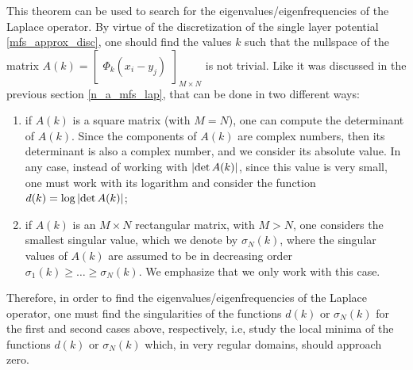 This theorem can be used to search for the eigenvalues/eigenfrequencies of the Laplace operator. By virtue of the discretization of the single layer potential \eqref{mfs_approx_disc}, one should find the values \(k\) such that the nullspace of the matrix \(A(k) = \begin{bmatrix}
    \Phi_k(x_i - y_j)
\end{bmatrix}_{M \times N}\) is not trivial. Like it was discussed in the previous section \ref{n_a_mfs_lap}, that can be done in two different ways:
\begin{enumerate}
    \item if \(A(k)\) is a square matrix (with \(M=N\)), one can compute the determinant of \(A(k)\). Since the components of \(A(k)\) are complex numbers, then its determinant is also a complex number, and we consider its absolute value. In any case, instead of working with \(\abs{\determinant A(k)}\), since this value is very small, one must work with its logarithm and consider the function \(d(k) = \log \abs{\determinant A(k)}\);
    \item if \(A(k)\) is an \(M\times N\) rectangular matrix, with \(M > N\), one considers the smallest singular value, which we denote by \(\sigma_N(k)\), where the singular values of \(A(k)\) are assumed to be in decreasing order \(\sigma_1(k) \geq \dots \geq \sigma_N(k)\). We emphasize that we only work with this case.
\end{enumerate}
Therefore, in order to find the eigenvalues/eigenfrequencies of the Laplace operator, one must find the singularities of the functions \(d(k)\) or \(\sigma_N(k)\) for the first and second cases above, respectively, i.e, study the local minima of the functions \(d(k)\) or \(\sigma_N(k)\) which, in very regular domains, should approach zero.

